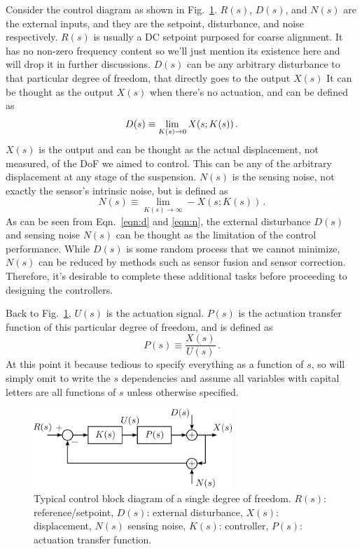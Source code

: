Consider the control diagram as shown in Fig.~\ref{fig:generalcontrolblockdiagram}.
$R(s)$, $D(s)$, and $N(s)$ are the external inputs, and they are the setpoint, disturbance, and noise respectively.
$R(s)$ is usually a DC setpoint purposed for coarse alignment.
It has no non-zero frequency content so we'll just mention its existence here and will drop it in further discussions.
$D(s)$ can be any arbitrary disturbance to that particular degree of freedom, that directly goes to the output $X(s)$
It can be thought as the output $X(s)$ when there's no actuation, and can be defined as
\begin{equation}
	D(s) \equiv \lim_{K(s)\to 0} X\mleft(s;K(s)\mright)\,.
	\label{eqn:d}
\end{equation}
$X(s)$ is the output and can be thought as the actual displacement, not measured, of the DoF we aimed to control.
This can be any of the arbitrary displacement at any stage of the suspension.
$N(s)$ is the sensing noise, not exactly the sensor's intrinsic noise, but is defined as
\begin{equation}
	N(s) \equiv \lim_{K(s)\to\infty} -X(s;K(s))\,.
	\label{eqn:n}
\end{equation}
As can be seen from Eqn.~\eqref{eqn:d} and \eqref{eqn:n}, the external disturbance $D(s)$ and sensing noise $N(s)$ can be thought as the limitation of the control performance.
While $D(s)$ is some random process that we cannot minimize, $N(s)$ can be reduced by methods such as sensor fusion and sensor correction.
Therefore, it's desirable to complete these additional tasks before proceeding to designing the controllers.

Back to Fig.~\ref{fig:generalcontrolblockdiagram}, $U(s)$ is the actuation signal.
$P(s)$ is the actuation transfer function of this particular degree of freedom, and is defined as
\begin{equation}
	P(s) \equiv \frac{X(s)}{U(s)}\,.
\end{equation}
At this point it because tedious to specify everything as a function of $s$, so will simply omit to write the $s$ dependencies and assume all variables with capital letters are all functions of $s$ unless otherwise specified.
\begin{figure}[!h]
	\centering
	\includegraphics[width=75mm]{figures/general_control_block_diagram}
	\caption{Typical control block diagram of a single degree of freedom. $R(s)$: reference/setpoint, $D(s)$: external disturbance, $X(s)$: displacement, $N(s)$ sensing noise, $K(s)$: controller, $P(s)$: actuation transfer function.}
	\label{fig:generalcontrolblockdiagram}
\end{figure}

